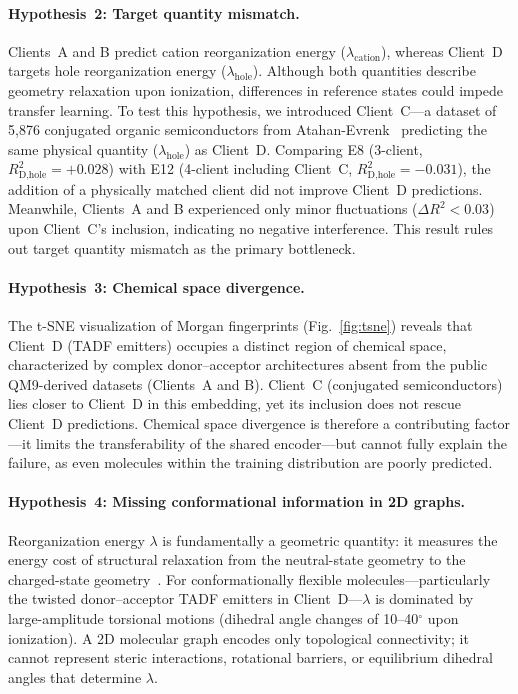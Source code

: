 \documentclass[twocolumn]{article}
\newcommand{\lam}{\lambda}
\newcommand{\lamhole}{\lambda_{\text{hole}}}
\newcommand{\lamcat}{\lambda_{\text{cation}}}
\newcommand{\Rsq}{R^{2}}
\begin{document}
\paragraph{Hypothesis~2: Target quantity mismatch.}
Clients~A and B predict cation reorganization energy ($\lamcat$), whereas Client~D targets hole reorganization energy ($\lamhole$).
Although both quantities describe geometry relaxation upon ionization, differences in reference states could impede transfer learning.
To test this hypothesis, we introduced Client~C---a dataset of 5{,}876 conjugated organic semiconductors from Atahan-Evrenk~\cite{AtahanEvrenk2019_RE} predicting the same physical quantity ($\lamhole$) as Client~D.
Comparing E8 (3-client, $\Rsq_{\text{D,hole}} = +0.028$) with E12 (4-client including Client~C, $\Rsq_{\text{D,hole}} = -0.031$), the addition of a physically matched client did not improve Client~D predictions.
Meanwhile, Clients~A and B experienced only minor fluctuations ($\Delta \Rsq < 0.03$) upon Client~C's inclusion, indicating no negative interference.
This result rules out target quantity mismatch as the primary bottleneck.

\paragraph{Hypothesis~3: Chemical space divergence.}
The t-SNE visualization of Morgan fingerprints (Fig.~\ref{fig:tsne}) reveals that Client~D (TADF emitters) occupies a distinct region of chemical space, characterized by complex donor--acceptor architectures absent from the public QM9-derived datasets (Clients~A and B).
Client~C (conjugated semiconductors) lies closer to Client~D in this embedding, yet its inclusion does not rescue Client~D predictions.
Chemical space divergence is therefore a contributing factor---it limits the transferability of the shared encoder---but cannot fully explain the failure, as even molecules within the training distribution are poorly predicted.

\paragraph{Hypothesis~4: Missing conformational information in 2D graphs.}
Reorganization energy $\lam$ is fundamentally a geometric quantity: it measures the energy cost of structural relaxation from the neutral-state geometry to the charged-state geometry~\cite{Marcus1993,Coropceanu2007}.
For conformationally flexible molecules---particularly the twisted donor--acceptor TADF emitters in Client~D---$\lam$ is dominated by large-amplitude torsional motions (dihedral angle changes of 10--40$^{\circ}$ upon ionization).
A 2D molecular graph encodes only topological connectivity; it cannot represent steric interactions, rotational barriers, or equilibrium dihedral angles that determine $\lam$.
\end{document}

